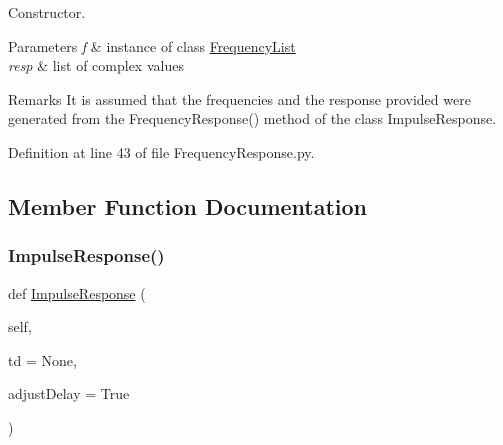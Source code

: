 Constructor. 


\begin{DoxyParams}{Parameters}
{\em f} & instance of class \hyperlink{namespaceSignalIntegrity_1_1FrequencyDomain_1_1FrequencyList}{Frequency\+List} \\
\hline
{\em resp} & list of complex values \\
\hline
\end{DoxyParams}
\begin{DoxyRemark}{Remarks}
It is assumed that the frequencies and the response provided were generated from the Frequency\+Response() method of the class Impulse\+Response. 
\end{DoxyRemark}


Definition at line 43 of file Frequency\+Response.\+py.



\subsection{Member Function Documentation}
\mbox{\label{classSignalIntegrity_1_1FrequencyDomain_1_1FrequencyResponse_1_1FrequencyResponse_aa301152e06c3881589eb5c70d53734f6}} 
\subsubsection{\texorpdfstring{Impulse\+Response()}{ImpulseResponse()}}
{\footnotesize\ttfamily def \hyperlink{classSignalIntegrity_1_1TimeDomain_1_1Waveform_1_1ImpulseResponse_1_1ImpulseResponse}{Impulse\+Response} (\begin{DoxyParamCaption}\item[{}]{self,  }\item[{}]{td = {\ttfamily None},  }\item[{}]{adjust\+Delay = {\ttfamily True} }\end{DoxyParamCaption})}



